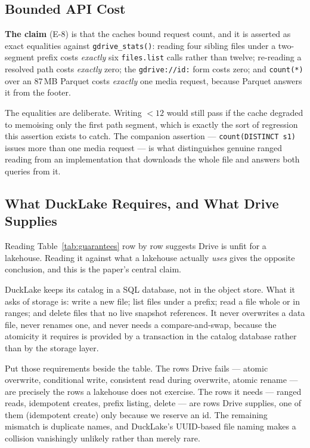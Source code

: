 \documentclass[sigconf, nonacm]{acmart}
\newcommand{\expref}[1]{\textsf{E-#1}}
\begin{document}
\subsection{Bounded API Cost}

\textbf{The claim} (\expref{8}) is that the caches bound request count, and it
is asserted as exact equalities against \texttt{gdrive\_stats()}: reading four
sibling files under a two-segment prefix costs \emph{exactly} six
\texttt{files.list} calls rather than twelve; re-reading a resolved path costs
\emph{exactly} zero; the \texttt{gdrive://id:} form costs zero; and
\texttt{count(*)} over an 87\,MB Parquet costs \emph{exactly} one media
request, because Parquet answers it from the footer.

The equalities are deliberate. Writing $<12$ would still pass if the cache
degraded to memoising only the first path segment, which is exactly the sort of
regression this assertion exists to catch. The companion assertion ---
\texttt{count(DISTINCT s1)} issues more than one media request --- is what
distinguishes genuine ranged reading from an implementation that downloads the
whole file and answers both queries from it.

\subsection{What DuckLake Requires, and What Drive Supplies}
\label{sec:thesis}

Reading Table~\ref{tab:guarantees} row by row suggests Drive is unfit for a
lakehouse. Reading it against what a lakehouse actually \emph{uses} gives the
opposite conclusion, and this is the paper's central claim.

DuckLake keeps its catalog in a SQL database, not in the object store. What it
asks of storage is: write a new file; list files under a prefix; read a file
whole or in ranges; and delete files that no live snapshot references. It never
overwrites a data file, never renames one, and never needs a compare-and-swap,
because the atomicity it requires is provided by a transaction in the catalog
database rather than by the storage layer.

Put those requirements beside the table. The rows Drive fails --- atomic
overwrite, conditional write, consistent read during overwrite, atomic rename
--- are precisely the rows a lakehouse does not exercise. The rows it needs ---
ranged reads, idempotent creates, prefix listing, delete --- are rows Drive
supplies, one of them (idempotent create) only because we reserve an id. The
remaining mismatch is duplicate names, and DuckLake's UUID-based file naming
makes a collision vanishingly unlikely rather than merely rare.
\end{document}

